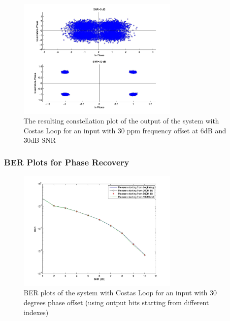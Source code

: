 \documentclass[]{article}
\begin{document}
\begin{figure}[H]
\centering
\hspace*{-2cm}\includegraphics[width=0.7\textwidth]{qpConstfo_costas2.jpg}
\caption{The resulting constellation plot of the output of the system with Costas Loop for an input with 30 ppm frequency offset at 6dB and 30dB SNR \label{fig:costasConstFreq2} }
\end{figure}

\subsubsection{BER Plots for Phase Recovery}
\begin{figure}[H]
\centering
\hspace*{-2cm}\includegraphics[width=0.7\textwidth]{qpBERpo_costas1.jpg}
\caption{BER plots of the system with Costas Loop for an input with 30 degrees phase offset (using output bits starting from different indexes) \label{fig:costasBERphase}}
\end{figure}
\end{document}

